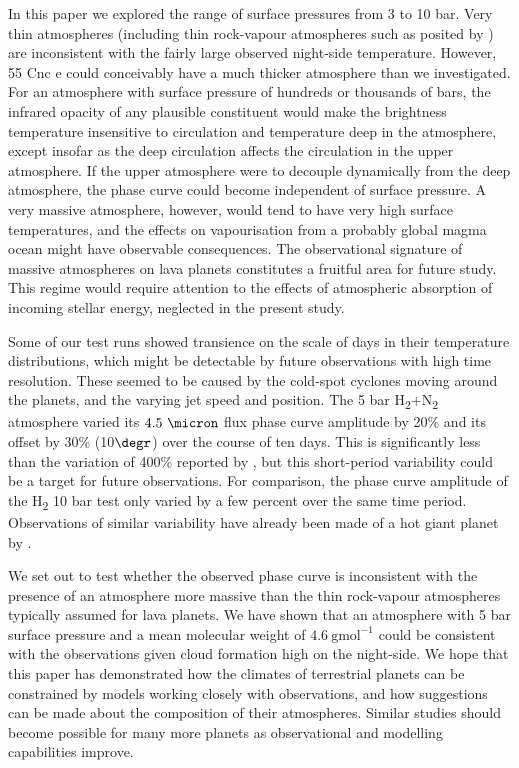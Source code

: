 In this paper we explored the range of surface pressures from 3 to 10 bar. Very thin atmospheres (including thin rock-vapour atmospheres such as posited by \citep{castan2011hot}) are inconsistent with the fairly large observed night-side temperature.  However, 55 Cnc e could conceivably have a much thicker atmosphere than we investigated. For an atmosphere with surface pressure of hundreds or thousands of bars, the infrared opacity of any plausible constituent would make the brightness temperature insensitive to circulation and temperature deep in the atmosphere, except insofar as the deep circulation affects the circulation in the upper atmosphere. If the upper atmosphere were to decouple dynamically from the deep atmosphere, the phase curve could become independent of surface pressure.  A very massive atmosphere, however, would tend to have very high surface temperatures, and the effects on vapourisation from a probably global magma ocean might have observable consequences.  The observational signature of massive atmospheres on lava planets constitutes a fruitful area for future study. This regime would require attention to the effects of atmospheric absorption of incoming stellar energy, neglected in the present study.

Some of our test runs showed transience on the scale of days in their temperature distributions, which might be detectable by future observations with high time resolution. These seemed to be caused by the cold-spot cyclones moving around the planets, and the varying jet speed and position. The 5 bar H\textsubscript{2}+N\textsubscript{2} atmosphere varied its $4.5\ \micron$ flux phase curve amplitude by 20\% and its offset by 30\% (10$\degr$) over the course of ten days. This is significantly less than the variation of 400\% reported by \citet{demory2016variability}, but this short-period variability could be a target for future observations. For comparison, the phase curve amplitude of the H\textsubscript{2} 10 bar test only varied by a few percent over the same time period. Observations of similar variability have already been made of a hot giant planet by \citet{armstrong2016variability}.

We set out to test whether the observed phase curve is inconsistent with the presence of an atmosphere more massive than the thin rock-vapour atmospheres typically assumed for lava planets. We have shown that an atmosphere with 5 bar surface pressure and a mean molecular weight of $4.6\ \mathrm{gmol}^{-1}$ could be consistent with the observations given cloud formation high on the night-side. We hope that this paper has demonstrated how the climates of terrestrial planets can be constrained by models working closely with observations, and how suggestions can be made about the composition of their atmospheres. Similar studies should become possible for many more planets as observational and modelling capabilities improve.






% 
% 
